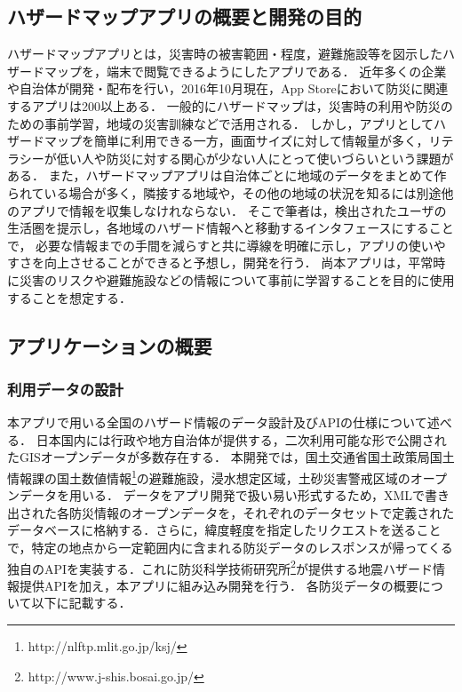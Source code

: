 \documentclass[a4paper]{jsarticle}
\begin{document}
\subsection{ハザードマップアプリの概要と開発の目的}
ハザードマップアプリとは，災害時の被害範囲・程度，避難施設等を図示したハザードマップを，端末で閲覧できるようにしたアプリである．
近年多くの企業や自治体が開発・配布を行い，2016年10月現在，App Storeにおいて防災に関連するアプリは200以上ある．
一般的にハザードマップは，災害時の利用や防災のための事前学習，地域の災害訓練などで活用される．
しかし，アプリとしてハザードマップを簡単に利用できる一方，画面サイズに対して情報量が多く，リテラシーが低い人や防災に対する関心が少ない人にとって使いづらいという課題がある．
また，ハザードマップアプリは自治体ごとに地域のデータをまとめて作られている場合が多く，隣接する地域や，その他の地域の状況を知るには別途他のアプリで情報を収集しなけれならない．
そこで筆者は，検出されたユーザの生活圏を提示し，各地域のハザード情報へと移動するインタフェースにすることで，
必要な情報までの手間を減らすと共に導線を明確に示し，アプリの使いやすさを向上させることができると予想し，開発を行う．
尚本アプリは，平常時に災害のリスクや避難施設などの情報について事前に学習することを目的に使用することを想定する．


\subsection{アプリケーションの概要}

\subsubsection{利用データの設計}
本アプリで用いる全国のハザード情報のデータ設計及びAPIの仕様について述べる．
日本国内には行政や地方自治体が提供する，二次利用可能な形で公開されたGISオープンデータが多数存在する．
本開発では，国土交通省国土政策局国土情報課の国土数値情報\footnote{http://nlftp.mlit.go.jp/ksj/}の避難施設，浸水想定区域，土砂災害警戒区域のオープンデータを用いる．
データをアプリ開発で扱い易い形式するため，XMLで書き出された各防災情報のオープンデータを，それぞれのデータセットで定義されたデータベースに格納する．さらに，緯度軽度を指定したリクエストを送ることで，特定の地点から一定範囲内に含まれる防災データのレスポンスが帰ってくる独自のAPIを実装する．これに防災科学技術研究所\footnote{http://www.j-shis.bosai.go.jp/}が提供する地震ハザード情報提供APIを加え，本アプリに組み込み開発を行う．
各防災データの概要について以下に記載する．
\end{document}
